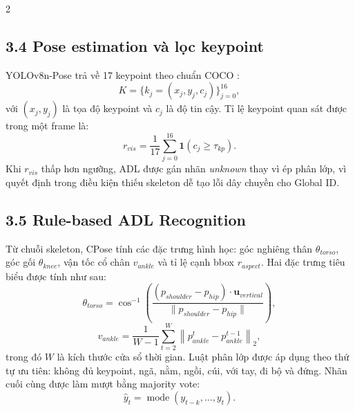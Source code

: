 \documentclass[a4paper, twoside, 10pt]{article}
\begin{document}
\begin{multicols}{2}
\subsection*{3.4 Pose estimation và lọc keypoint}
YOLOv8n-Pose trả về 17 keypoint theo chuẩn COCO \cite{key51}:
\begin{equation}
K=\{k_j=(x_j,y_j,c_j)\}_{j=0}^{16},
\end{equation}
với $(x_j,y_j)$ là tọa độ keypoint và $c_j$ là độ tin cậy. Tỉ lệ keypoint quan sát được trong một frame là:
\begin{equation}
r_{vis}=\frac{1}{17}\sum_{j=0}^{16}\mathbf{1}(c_j\geq \tau_{kp}).
\end{equation}
Khi $r_{vis}$ thấp hơn ngưỡng, ADL được gán nhãn \textit{unknown} thay vì ép phân lớp, vì quyết định trong điều kiện thiếu skeleton dễ tạo lỗi dây chuyền cho Global ID.

\subsection*{3.5 Rule-based ADL Recognition}
Từ chuỗi skeleton, CPose tính các đặc trưng hình học: góc nghiêng thân $\theta_{torso}$, góc gối $\theta_{knee}$, vận tốc cổ chân $v_{ankle}$ và tỉ lệ cạnh bbox $r_{aspect}$. Hai đặc trưng tiêu biểu được tính như sau:
\begin{equation}
\theta_{torso} = \cos^{-1}\left(\frac{(p_{shoulder}-p_{hip})\cdot \mathbf{u}_{vertical}}{\|p_{shoulder}-p_{hip}\|}\right),
\end{equation}
\begin{equation}
v_{ankle} = \frac{1}{W-1}\sum_{t=2}^{W}\left\|p^{t}_{ankle} - p^{t-1}_{ankle}\right\|_2,
\end{equation}
trong đó $W$ là kích thước cửa sổ thời gian. Luật phân lớp được áp dụng theo thứ tự ưu tiên: không đủ keypoint, ngã, nằm, ngồi, cúi, với tay, đi bộ và đứng. Nhãn cuối cùng được làm mượt bằng majority vote:
\begin{equation}
\hat{y}_t=\operatorname{mode}(y_{t-k},...,y_t).
\end{equation}


\end{multicols}
\end{document}
